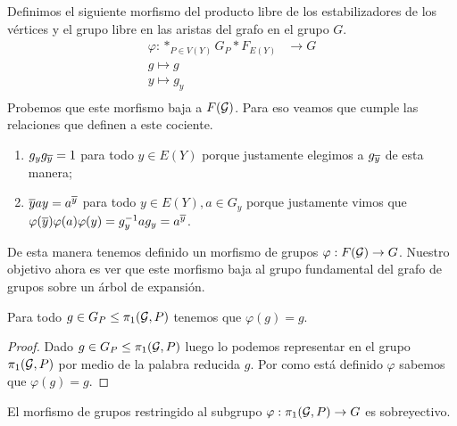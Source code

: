 \documentclass[tesis.tex]{subfiles}
\newcommand{\cG}{ {\cal G} }
\begin{document}
Definimos el siguiente morfismo del producto libre de los estabilizadores de los vértices y el grupo libre en las aristas del grafo en el grupo $G$.
\begin{align*}
	\varphi: \ast_{P \in V(Y)} G_P \ast F_{E(Y)} &\to G	\\
	g \mapsto g \\
	y \mapsto g_y \\
\end{align*}
Probemos que este morfismo baja a $F(\cG)$. 
Para eso veamos que cumple las relaciones que definen a este cociente.
\begin{enumerate}
	\item $g_y g_{\overline y} = 1$ para todo $y \in E(Y)$ porque justamente elegimos a $g_{\overline y}$ de esta manera;
	\item $\overline y a y = a^{\overline y}$ para todo $y \in E(Y), a \in G_y$ porque justamente vimos que $\varphi(\overline y) \varphi (a) \varphi(y) = g_y^{-1}ag_y = a^{\overline y}$.
\end{enumerate}

De esta manera tenemos definido un morfismo de grupos $\varphi: F(\cG) \to G$.
Nuestro objetivo ahora es ver que este morfismo baja al grupo fundamental del grafo de grupos sobre un árbol de expansión.


\begin{lema}\label{lema_morfismo_pi1_inyectivo}
	Para todo $g \in G_P \le \pi_1(\cG, P)$ tenemos que $\varphi(g)=g$.
\end{lema}

\begin{proof}
	Dado $g \in G_P \le \pi_1(\cG, P)$ luego lo podemos representar en el grupo $\pi_1(\cG, P)$ por medio de la palabra reducida $g$.
	Por como está definido $\varphi$ sabemos que $\varphi(g) = g$. 
\end{proof}

\begin{prop}
	El morfismo de grupos restringido al subgrupo $\varphi: \pi_1(\cG, P) \to G$ es sobreyectivo.
\end{prop}
\end{document}
